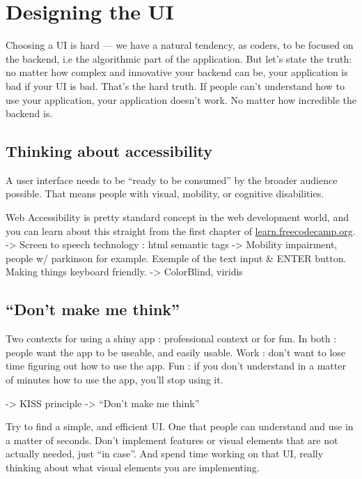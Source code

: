 \documentclass[]{book}
\begin{document}
\hypertarget{designing-the-ui}{%
\section{Designing the UI}\label{designing-the-ui}}

Choosing a UI is hard --- we have a natural tendency, as coders, to be focused on the backend, i.e the algorithmic part of the application. But let's state the truth: no matter how complex and innovative your backend can be, your application is bad if your UI is bad. That's the hard truth. If people can't understand how to use your application, your application doesn't work. No matter how incredible the backend is.

\hypertarget{thinking-about-accessibility}{%
\subsection{Thinking about accessibility}\label{thinking-about-accessibility}}

A user interface needs to be ``ready to be consumed'' by the broader audience possible. That means people with visual, mobility, or cognitive disabilities.

Web Accessibility is pretty standard concept in the web development world, and you can learn about this straight from the first chapter of \href{https://learn.freecodecamp.org/}{learn.freecodecamp.org}.
-\textgreater{} Screen to speech technology : html semantic tags
-\textgreater{} Mobility impairment, people w/ parkinson for example. Exemple of the text input \& ENTER button. Making things keyboard friendly.
-\textgreater{} ColorBlind, viridis

\hypertarget{dont-make-me-think}{%
\subsection{``Don't make me think''}\label{dont-make-me-think}}

Two contexts for using a shiny app : professional context or for fun. In both : people want the app to be useable, and easily usable. Work : don't want to lose time figuring out how to use the app. Fun : if you don't understand in a matter of minutes how to use the app, you'll stop using it.

-\textgreater{} KISS principle
-\textgreater{} ``Don't make me think''

Try to find a simple, and efficient UI. One that people can understand and use in a matter of seconds. Don't implement features or visual elements that are not actually needed, just ``in case''. And spend time working on that UI, really thinking about what visual elements you are implementing.
\end{document}

